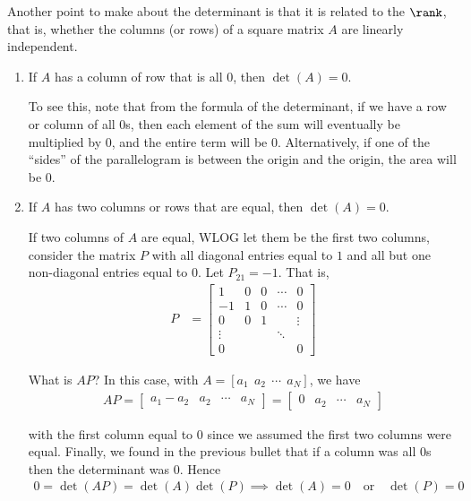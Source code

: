 \documentclass{article}
\begin{document}
Another point to make about the determinant is that it is related to the $\rank$, that is, whether the columns (or rows) of a square matrix $A$ are linearly independent.
\begin{enumerate}
  \item If $A$ has a column of row that is all $0$, then $\det(A) = 0$.

    To see this, note that from the formula of the determinant, if we have a row or column of all $0$s, then each element of the sum will eventually be multiplied by $0$, and the entire term will be $0$. Alternatively, if one of the ``sides'' of the parallelogram is between the origin and the origin, the area will be $0$.

  \item If $A$ has two columns or rows that are equal, then $\det(A) = 0$.

    If two columns of $A$ are equal, WLOG let them be the first two columns, consider the matrix $P$ with all diagonal entries equal to $1$ and all but one non-diagonal entries equal to $0$. Let $P_{21} = -1$. That is,
    \begin{align*}
      P
      &
      =
      \begin{bmatrix}
        1      & 0 & 0 & \cdots & 0 \\
        -1     & 1 & 0 & \cdots & 0 \\
        0      & 0 & 1 &        & \vdots \\
        \vdots &   &   & \ddots &   \\
        0      &   &   &        & 0
      \end{bmatrix}
    \end{align*}

    What is $A P$? In this case, with $A = [a_1 ~~ a_2 ~~ \cdots ~~ a_N]$, we have
    \begin{align*}
      A P
      =
      \begin{bmatrix}
        a_1 - a_2 & a_2 & \cdots & a_N
      \end{bmatrix}
      =
      \begin{bmatrix}
        0 & a_2 & \cdots & a_N
      \end{bmatrix}
    \end{align*}

    with the first column equal to $0$ since we assumed the first two columns were equal. Finally, we found in the previous bullet that if a column was all $0$s then the determinant was $0$. Hence
    \begin{align*}
      0
      =
      \det(A P)
      =
      \det(A) \det(P)
      \implies
      \det(A) = 0 \quad\text{or}\quad \det(P) = 0
    \end{align*}


\end{enumerate}
\end{document}
